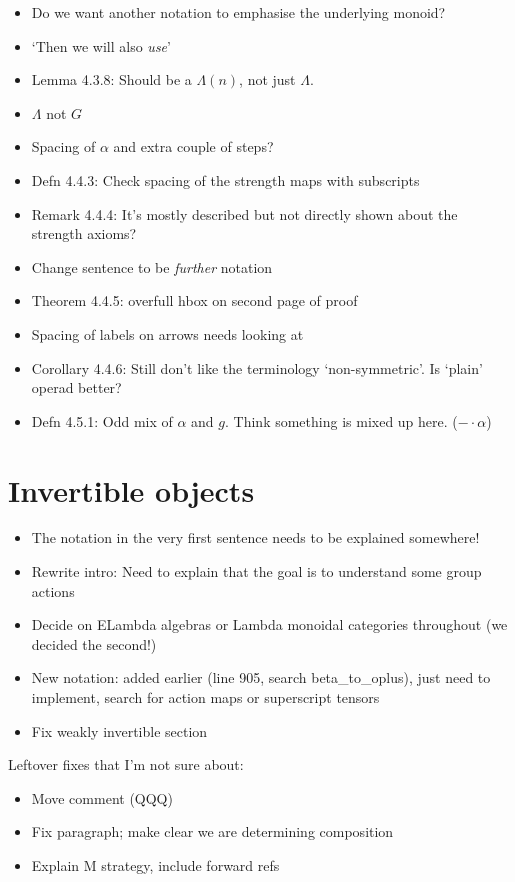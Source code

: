 \documentclass{amsart}
\begin{document}
\begin{itemize}
\item Do we want another notation to emphasise the underlying monoid?
\item `Then we will also \textit{use}'
\item Lemma 4.3.8: Should be a $\Lambda(n)$, not just $\Lambda$.
\item $\Lambda$ not $G$
\item Spacing of $\alpha$ and extra couple of steps?
\item Defn 4.4.3: Check spacing of the strength maps with subscripts
\item Remark 4.4.4: It's mostly described but not directly shown about the strength axioms?
\item Change sentence to be \textit{further} notation
\item Theorem 4.4.5: overfull hbox on second page of proof
\item Spacing of labels on arrows needs looking at
\item Corollary 4.4.6: Still don't like the terminology `non-symmetric'. Is `plain' operad better?
\item Defn 4.5.1: Odd mix of $\alpha$ and $g$. Think something is mixed up here. ($- \cdot \alpha$)
\end{itemize}



\section{ Invertible objects}

\begin{itemize}
\item The notation in the very first sentence needs to be explained somewhere!
\item Rewrite intro: Need to explain that the goal is to understand some group actions
\item Decide on ELambda algebras or Lambda monoidal categories throughout (we decided the second!)
\item New notation: added earlier (line 905, search beta\_to\_oplus), just need to implement, search for action maps or superscript tensors
\item Fix weakly invertible section
\end{itemize}

Leftover fixes that I'm not sure about:
\begin{itemize}
\item Move comment (QQQ)
\item Fix paragraph; make clear we are determining composition
\item Explain M strategy, include forward refs
\end{itemize}
\end{document}
